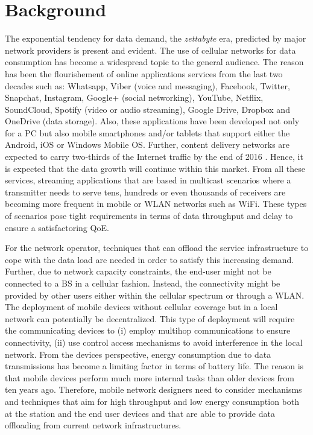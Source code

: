 \section{Background}\label{sec:background}

The exponential tendency for data demand, the \textit{zettabyte} era, predicted by major network providers \cite{cisco2016forecast,kremling2015presentation,belllabs2016report,ericsson2015report} is present and evident. The use of cellular networks for data consumption has become a widespread topic to the general audience. The reason has been the flourishement of online applications services from the last two decades such as:  Whatsapp, Viber (voice and messaging), Facebook, Twitter, Snapchat, Instagram, Google+ (social networking), YouTube, Netflix, SoundCloud, Spotify (video or audio streaming), Google Drive, Dropbox and OneDrive (data storage). Also, these applications have been developed not only for a \ac{PC} but also mobile smartphones and/or tablets that support either the Android, iOS or Windows Mobile \ac{OS}. Further, content delivery networks are expected to carry two-thirds of the Internet traffic by the end of 2016 \cite{cisco2016forecast}. Hence, it is expected that the data growth will continue within this market. From all these services, streaming applications that are based in multicast scenarios where a transmitter needs to serve tens, hundreds or even thousands of receivers are becoming more frequent in mobile or \ac{WLAN} networks such as \ac{WiFi}. These types of scenarios pose tight requirements in terms of data throughput and delay to ensure a satisfactoring \ac{QoE}.

For the network operator, techniques that can offload the service infrastructure to cope with the data load are needed in order to satisfy this increasing demand. Further, due to network capacity constraints, the end-user might not be connected to a \ac{BS} in a cellular fashion. Instead, the connectivity might be provided by other users either within the cellular spectrum or through a \ac{WLAN}. The deployment of mobile devices without cellular coverage but in a local network can potentially be decentralized. This type of deployment will require the communicating devices to (i) employ multihop communications to ensure connectivity, (ii) use control access mechanisms to avoid interference in the local network. From the devices perspective, energy consumption due to data transmissions has become a limiting factor in terms of battery life. The reason is that mobile devices perform much more internal tasks than older devices from ten years ago. Therefore, mobile network designers need to consider mechanisms and techniques that aim for high throughput and low energy consumption both at the station and the end user devices and that are able to provide data offloading from current network infrastructures.

